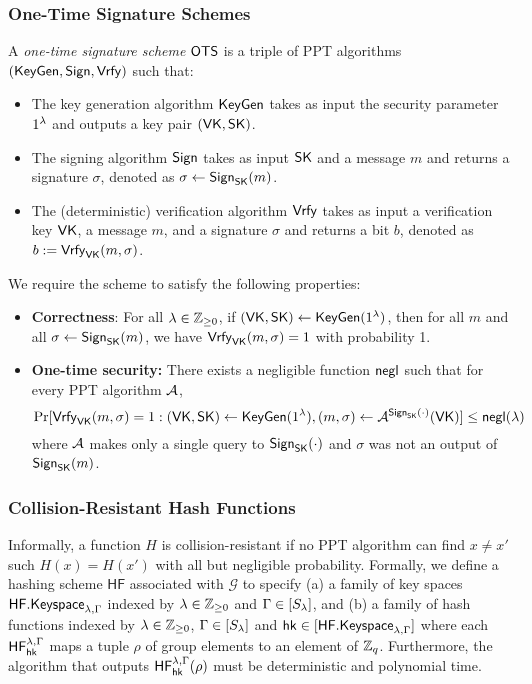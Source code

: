 \subsubsection{One-Time Signature Schemes} 
	A \emph{one-time signature scheme} $\mathsf{OTS}$ is a triple of PPT algorithms $(\mathsf{KeyGen},\mathsf{Sign},\mathsf{Vrfy})$ such that:
	\begin{itemize}
		\item The key generation algorithm $\mathsf{KeyGen}$ takes as input the security parameter $1^\lambda$ and outputs a key pair $(\mathsf{VK},\mathsf{SK})$.
		\item The signing algorithm $\mathsf{Sign}$ takes as input $\mathsf{SK}$ and a message $m$ and returns a signature $\sigma$, denoted as $\sigma\gets\mathsf{Sign}_{\mathsf{SK}}(m)$.
		\item The (deterministic) verification algorithm $\mathsf{Vrfy}$ takes as input a verification key $\mathsf{VK}$, a message $m$, and a signature $\sigma$ and returns a bit $b$, denoted as $b := \mathsf{Vrfy}_{\mathsf{VK}}(m,\sigma)$.
	\end{itemize}
	We require the scheme to satisfy the following properties:
	\begin{itemize}
		\item \textbf{Correctness}: For all $\lambda\in\mathbb{Z}_{\geq 0}$, if $(\mathsf{VK},\mathsf{SK})\gets\mathsf{KeyGen}(1^\lambda)$, then for all $m$ and all $\sigma\gets\mathsf{Sign}_{\mathsf{SK}}(m)$, we have $\mathsf{Vrfy}_{\mathsf{VK}}(m,\sigma)=1$ with probability 1.
		\item \textbf{One-time security:} There exists a negligible function $\mathsf{negl}$ such that for every PPT algorithm $\mathcal{A}$, $$\Pr[\mathsf{Vrfy}_{\mathsf{VK}}(m,\sigma)=1: (\mathsf{VK},\mathsf{SK})\gets\mathsf{KeyGen}(1^\lambda), (m,\sigma)\gets\mathcal{A}^{\mathsf{Sign}_{\mathsf{SK}}(\cdot)}(\mathsf{VK})]\leq\mathsf{negl}(\lambda)$$ where $\mathcal{A}$ makes only a single query to $\mathsf{Sign}_{\mathsf{SK}}(\cdot)$ and $\sigma$ was not an output of $\mathsf{Sign}_{\mathsf{SK}}(m)$.
	\end{itemize}


\subsubsection{Collision-Resistant Hash Functions}

Informally, a function $H$ is collision-resistant if no PPT algorithm can find $x\neq x'$ such $H(x)=H(x')$ with all but negligible probability. Formally, we define a hashing scheme $\mathsf{HF}$ associated with $\mathcal{G}$ to specify (a) a family of key spaces $\mathsf{HF.Keyspace}_{\lambda,\Gamma}$ indexed by $\lambda\in\mathbb{Z}_{\geq 0}$ and $\Gamma\in[S_\lambda]$, and (b) a family of hash functions indexed by $\lambda\in\mathbb{Z}_{\geq 0}$, $\Gamma\in[S_\lambda]$ and $\mathsf{hk}\in[\mathsf{HF.Keyspace}_{\lambda,\Gamma}]$ where each $\mathsf{HF}_{\mathsf{hk}}^{\lambda,\Gamma}$ maps a tuple $\rho$ of group elements to an element of $\mathbb{Z}_q$. Furthermore, the algorithm that outputs $\mathsf{HF}_{\mathsf{hk}}^{\lambda,\Gamma}(\rho)$ must be deterministic and polynomial time.


